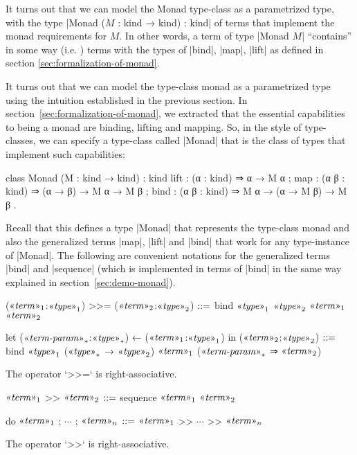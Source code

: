 It turns out that we can model the Monad type-class as a parametrized type, with the type \code|Monad ($M$ : kind → kind) : kind| of terms that implement the monad requirements for $M$.
In other words, a term of type \code|Monad $M$| ``contains'' in some way (i.e. ) terms with the types of \code|bind|, \code|map|, \code|lift| as defined in section \ref{sec:formalization-of-monad}.

It turns out that we can model the type-class monad as a parametrized type using the intuition established in the previous section.
In section~\ref{sec:formalization-of-monad}, we extracted that the essential capabilities to being a monad are binding, lifting and mapping.
So, in the style of type-classes, we can specify a type-class called \code|Monad| that is the class of types that implement such capabilities:
\begin{program}
class Monad (M : kind → kind) : kind
  { lift : (α : kind)   ⇒ α → M α
  ; map  : (α β : kind) ⇒ (α → β) → M α → M β
  ; bind : (α β : kind) ⇒ M α → (α → M β) → M β }.
\end{program}
Recall that this defines a type \code|Monad| that represents the type-class monad and also the generalized terms \code|map|, \code|lift| and \code|bind| that work for any type-instance of \code|Monad|.
The following are convenient notations for the generalized terms \code|bind| and \code|sequence| (which is implemented in terms of \code|bind| in the same way explained in section~\ref{sec:demo-monad}).
\begin{notational}[caption={Notations for binding.}]
($\mvar{term}_1$:$\mvar{type}_1$) >>= ($\mvar{term}_2$:$\mvar{type}_2$)
  $\syneq$
    bind $\mvar{type}_1$ $\mvar{type}_2$ $\mvar{term}_1$ $\mvar{term}_2$

let ($\mvar{term-param}_*$:$\mvar{type}_*$) ← ($\mvar{term}_1$:$\mvar{type}_1$) in ($\mvar{term}_2$:$\mvar{type}_2$)
  $\syneq$
    bind $\mvar{type}_1$ ($\mvar{type}_*$ → $\mvar{type}_2$) $\mvar{term}_1$ ($\mvar{term-param}_*$ ⇒ $\mvar{term}_2$)
\end{notational}
The operator \code`>>=` is right-associative.

\begin{notational}[caption={Notations for sequencing}]
$\mvar{term}_1$ >> $\mvar{term}_2$   $\syneq$   sequence $\mvar{term}_1$ $\mvar{term}_2$

do{ $\mvar{term}_1$ ; $\cdots$ ; $\mvar{term}_n$ }   $\syneq$   $\mvar{term}_1$ >> $\cdots$ >> $\mvar{term}_n$
\end{notational}
The operator \code`>>` is right-associative.

